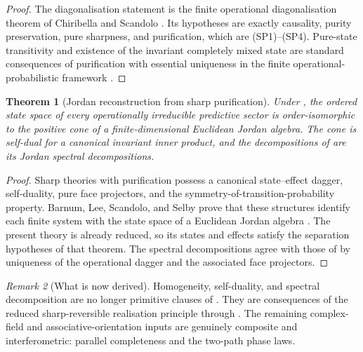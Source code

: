 \documentclass[11pt]{article}
\newtheorem{theorem}{Theorem}[section]
\theoremstyle{definition}
\theoremstyle{remark}
\newtheorem{remark}[theorem]{Remark}
\begin{document}
\begin{proof}
The diagonalisation statement is the finite operational diagonalisation theorem
of Chiribella and Scandolo \cite{ChiribellaScandolo2015}.  Its hypotheses are
exactly causality, purity preservation, pure sharpness, and purification, which
are \textup{(SP1)}--\textup{(SP4)}.  Pure-state transitivity and existence of the
invariant completely mixed state are standard consequences of purification with
essential uniqueness in the finite operational-probabilistic framework
\cite{ChiribellaDAPS2009}.
\end{proof}

\begin{theorem}[Jordan reconstruction from sharp purification]
\label{thm:operational-jordan}
Under , the ordered state space of every
operationally irreducible predictive sector is order-isomorphic to the positive
cone of a finite-dimensional Euclidean Jordan algebra.  The cone is self-dual
for a canonical invariant inner product, and the decompositions of
 are its Jordan spectral decompositions.
\end{theorem}

\begin{proof}
Sharp theories with purification possess a canonical state--effect dagger,
self-duality, pure face projectors, and the symmetry-of-transition-probability
property.  Barnum, Lee, Scandolo, and Selby prove that these structures identify
each finite system with the state space of a Euclidean Jordan algebra
\cite{BarnumLeeScandoloSelby2017}.  The present theory is already reduced, so its
states and effects satisfy the separation hypotheses of that theorem.  The
spectral decompositions agree with those of
 by uniqueness of the operational dagger
and the associated face projectors.
\end{proof}

\begin{remark}[What is now derived]
\label{rem:jordan-derived-not-assumed}
Homogeneity, self-duality, and spectral decomposition are no longer primitive
clauses of .  They are consequences of the
reduced sharp-reversible realisation principle through
.
The remaining complex-field and associative-orientation inputs are genuinely
composite and interferometric: parallel completeness and the two-path phase
laws.
\end{remark}
\end{document}
